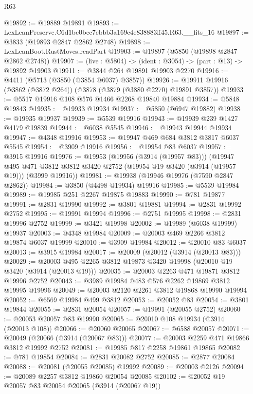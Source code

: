 \begin{lexlean}{R63}
\begin{coremodule}
@19892 := @19889 @19891
@19893 := LexLeanPreserve.C6d1bc0bcc7cbbb3a169c4e838883ff45.R63.__fits_16
@19897 := @3833 (@19893 @2847 @2862 @2748)
@19898 := LexLeanBoot.RustMoves.readPart
@19903 := @19897 (@5850 (@19898 @2847 @2862 @2748))
@19907 := (live : @5804) -> (ident : @3054) -> (part : @13) -> @19892 @19903
@19911 := @3844 @264 @19891 @19903 @2270
@19916 := @4411 (@5713 (@3850 (@3854 @6037) @3857))
@19926 := @19911 @19916 (@3862 (@3872 @264)) (@3878 (@3879 (@3880 @2270) @19891 @3857))
@19933 := @5517 @19916 @108 @576 @1466 @2268 @19840 @19884
@19934 := @5848 @19843
@19935 := @19933 @19934
@19937 := @5850 (@6947 @19882)
@19938 := @19935 @19937
@19939 := @5539 @19916
@19943 := @19939 @239 @1427 @4179 @19839
@19944 := @6038 @5545
@19946 := @19943 @19944 @19934
@19947 := @4348 @19916
@19953 := @19947 @469 @684 @3812 @3817 @6037 @5545
@19954 := @3909 @19916
@19956 := @19954 @83 @6037
@19957 := @3915 @19916
@19976 := @19953
    (@19956 (@3914 (@19957 @83)))
    (@19947
      @495
      @471
      @3812
      @3812
      @3420
      @2752
      (@19954 @19 @3420 (@3914 (@19957 @19)))
      (@3999 @19916))
@19981 := @19938 (@19946 @19976 (@7590 @2847 @2862))
@19984 := @3850 (@4498 @19934) @19916
@19985 := @5539 @19984
@19989 := @19985 @251 @2267 @19875 @19883
@19990 := @781 @19877
@19991 := @2831 @19990
@19992 := @3801 @19881
@19994 := @2831 @19992 @2752
@19995 := @19991 @19994
@19996 := @2751 @19995
@19998 := @2831 @19996 @2752
@19999 := @3421 @19998
@20002 := @19989 (@6038 @19999) @19937
@20003 := @4348 @19984
@20009 := @20003 @469 @2266 @3812 @19874 @6037 @19999
@20010 := @3909 @19984
@20012 := @20010 @83 @6037
@20013 := @3915 @19984
@20017 := @20009 (@20012 (@3914 (@20013 @83)))
@20029 := @20003 @495 @2265 @3812 @19873 @3420 @19998 (@20010 @19 @3420 (@3914 (@20013 @19)))
@20035 := @20003 @2263 @471 @19871 @3812 @19996 @2752
@20043 := @3989 @19984 @483 @576 @2262 @19869 @3812 @19995 @19996
@20049 := @20003 @2120 @2261 @3812 @19868 @19990 @19994
@20052 := @6569 @19984 @499 @3812
@20053 := @20052 @83
@20054 := @3801 @19844
@20055 := @2831 @20054
@20057 := @19991 (@20055 @2752)
@20060 := @20053 @20057 @83 @19990
@20065 := @20010 @108 @19934 (@3914 (@20013 @108))
@20066 := @20060 @20065
@20067 := @6588 @20057
@20071 := @20049 (@20066 (@3914 (@20067 @83)))
@20077 := @20003 @2259 @471 @19866 @3812 @19992 @2752
@20081 := @19985 @817 @2258 @19861 @19865
@20082 := @781 @19854
@20084 := @2831 @20082 @2752
@20085 := @2877 @20084
@20088 := @20081 (@20055 @20085) @19992
@20089 := @20003 @2126
@20094 := @20089 @2257 @3812 @19860 @20054 @20085
@20102 := @20052 @19 @20057 @83 @20054 @20065 (@3914 (@20067 @19))

\end{coremodule}
\end{lexlean}
